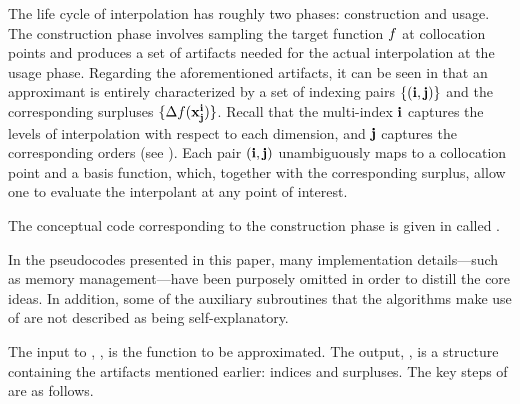 The life cycle of interpolation has roughly two phases: construction and usage.
The construction phase involves sampling the target function $f$ at collocation
points and produces a set of artifacts needed for the actual interpolation at
the usage phase. Regarding the aforementioned artifacts, it can be seen in
 that an approximant is entirely characterized by a set
of indexing pairs $\{ (\mathbf{i}, \mathbf{j}) \}$ and the corresponding surpluses $\{
\Delta f(\mathbf{x}^{\mathbf{i}}_{\mathbf{j}}) \}$. Recall that the multi-index $\mathbf{i}$ captures the levels
of interpolation with respect to each dimension, and $\mathbf{j}$ captures the
corresponding orders (see ). Each pair $(\mathbf{i}, \mathbf{j})$
unambiguously maps to a collocation point and a basis function, which, together
with the corresponding surplus, allow one to evaluate the interpolant at any
point of interest.


The conceptual code corresponding to the construction phase is given in
 called .

\begin{remark}
In the pseudocodes presented in this paper, many implementation details---such
as memory management---have been purposely omitted in order to distill the core
ideas. In addition, some of the auxiliary subroutines that the algorithms make
use of are not described as being self-explanatory.
\end{remark}

The input to , , is the function to be
approximated. The output, , is a structure containing the
artifacts mentioned earlier: indices and surpluses. The key steps of
 are as follows.

